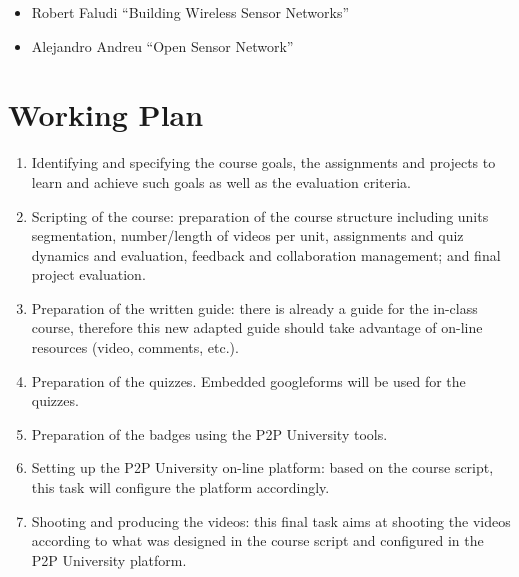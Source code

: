 \documentclass[oneside]{book}   %
\begin{document}
\begin{itemize}
\item Robert Faludi ``Building Wireless Sensor Networks''
\item Alejandro Andreu ``Open Sensor Network''
\end{itemize}



\chapter{Working Plan}

\begin{enumerate}
    \item Identifying and specifying the course goals, the assignments and projects to learn and achieve such goals as well as the evaluation criteria.
	\item Scripting of the course: preparation of the course structure including units segmentation, number/length of videos per unit, assignments and quiz dynamics and evaluation, feedback and collaboration management; and final project evaluation.
	\item Preparation of the written guide: there is already a guide for the in-class course, therefore this new adapted guide should take advantage of on-line resources (video, comments, etc.).
    \item Preparation of the quizzes. 
    Embedded googleforms will be used for the quizzes.
    \item Preparation of the badges using the P2P University tools.
	\item Setting up the P2P University on-line platform: based on the course script, this task will configure the platform accordingly.
	\item Shooting and producing the videos: this final task aims at shooting the videos according to what was designed in the course script and configured in the P2P University platform.
\end{enumerate}


\end{document}
